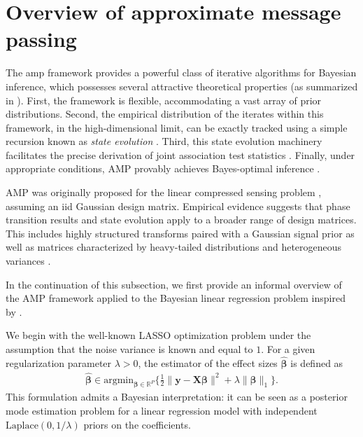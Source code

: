 \section{Overview of approximate message passing}

The \gls{amp} framework \cite{DMM09,rangan_vector_2019,feng2022unifying} provides a powerful class of iterative algorithms for Bayesian inference, which possesses several attractive theoretical properties (as summarized in \cite{Depope2026}). First, the framework is flexible, accommodating a vast array of prior distributions. Second, the empirical distribution of the iterates within this framework, in the high-dimensional limit, can be exactly tracked using a simple recursion known as \textit{state evolution} \cite{Bayati2011}. Third, this state evolution machinery facilitates the precise derivation of joint association test statistics \cite{montanari2017estimation,feng2022unifying}. Finally, under appropriate conditions, AMP provably achieves Bayes-optimal inference \cite{barbier-mmse-glm-pnas,montanari2017estimation,barbier2023fundamental,zhang2026optimal}.

AMP was originally proposed for the linear compressed sensing problem \cite{DMM09, Bayati2011, krzakala2012}, assuming an \gls{iid} Gaussian design matrix. Empirical evidence \cite{donoho2009observed, monajemi2013deterministic} suggests that phase transition results and state evolution apply to a broader range of design matrices. This includes highly structured transforms paired with a Gaussian signal prior \cite{dudeja2022universality} as well as matrices characterized by heavy-tailed distributions and heterogeneous variances \cite{Wang22AMPUniversality}.

In the continuation of this subsection, we first provide an informal overview of the AMP framework applied to the Bayesian linear regression problem inspired by \cite{feng2022unifying}.  

We begin with the well-known LASSO optimization problem under the assumption that the noise variance is known and equal to $1$. For a given regularization parameter $\lambda > 0$, the estimator of the effect sizes $\hat{\bm{\beta}}$ is defined as  
\begin{align}
    \label{Lasso_problem}
    \hat{\bm{\beta}} \in \text{argmin}_{\bm{\beta} \in \mathbb{R}^P} \bigg\{ \frac{1}{2} \lVert \bm{y} - \bm{X} \bm{\beta} \rVert^2 + \lambda \lVert \bm{\beta} \rVert_1 \bigg\}.
\end{align}
This formulation admits a Bayesian interpretation: it can be seen as a posterior mode estimation problem for a linear regression model with independent $\text{Laplace}(0,1/\lambda)$ priors on the coefficients.  

